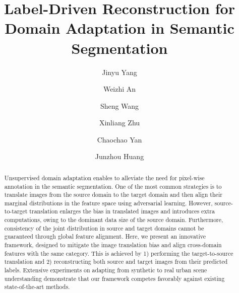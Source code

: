 \documentclass[runningheads]{llncs}
\begin{document}
\pagestyle{headings}
\mainmatter
\def\ECCVSubNumber{5818}  

\title{Label-Driven Reconstruction for Domain Adaptation in Semantic Segmentation} 

\begin{comment}
\titlerunning{ECCV-20 submission ID \ECCVSubNumber} 
\authorrunning{ECCV-20 submission ID \ECCVSubNumber} 
\author{Anonymous ECCV submission}
\institute{Paper ID \ECCVSubNumber}
\end{comment}


\author{Jinyu Yang \and
Weizhi An \and
Sheng Wang \and
Xinliang Zhu \and 
Chaochao Yan \and 
Junzhou Huang}
\maketitle

\begin{abstract}
Unsupervised domain adaptation enables to alleviate the need for pixel-wise annotation in the semantic segmentation. One of the most common strategies is to translate images from the source domain to the target domain and then align their marginal distributions in the feature space using adversarial learning. However, source-to-target translation enlarges the bias in translated images and introduces extra computations, owing to the dominant data size of the source domain. Furthermore, consistency of the joint distribution in source and target domains cannot be guaranteed through global feature alignment. Here, we present an innovative framework, designed to mitigate the image translation bias and align cross-domain features with the same category. This is achieved by 1) performing the target-to-source translation and 2) reconstructing both source and target images from their predicted labels. Extensive experiments on adapting from synthetic to real urban scene understanding demonstrate that our framework competes favorably against existing state-of-the-art methods.

\end{abstract}	
	
\end{document}
